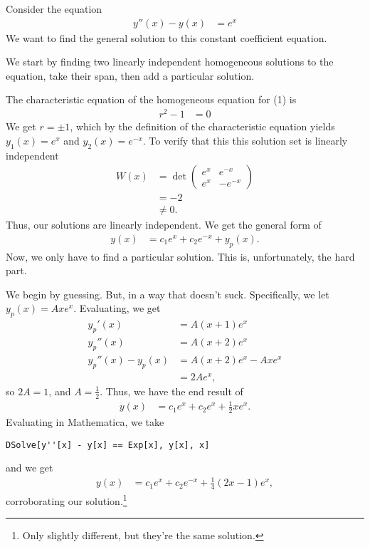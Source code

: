 \documentclass[10pt]{mypackage}
\begin{document}
\begin{example}
  Consider the equation
  \begin{align*}
    y''(x) - y(x) &= e^{x}\tag{1}
  \end{align*}
  We want to find the general solution to this constant coefficient equation.\newline

  We start by finding two linearly independent homogeneous solutions to the equation, take their span, then add a particular solution.\newline

  The characteristic equation of the homogeneous equation for (1) is
  \begin{align*}
    r^2 - 1 &= 0
  \end{align*}
  We get $r=\pm 1$, which by the definition of the characteristic equation yields $y_1(x) = e^{x}$ and $y_2(x) = e^{-x}$. To verify that this this solution set is linearly independent
  {\renewcommand{\arraystretch}{1.25}
    \begin{align*}
      W(x) &= \det \begin{pmatrix}e^{x} & e^{-x} \\ e^{x} & -e^{-x}\end{pmatrix}\\
           &= -2\\
           &\neq 0.
  \end{align*}
  }
  Thus, our solutions are linearly independent. We get the general form of
  \begin{align*}
    y(x) &= c_1e^{x} + c_2e^{-x} + y_p(x).
  \end{align*}
  Now, we only have to find a particular solution. This is, unfortunately, the hard part.\newline

  We begin by guessing. But, in a way that doesn't suck. Specifically, we let $y_p(x) = Axe^{x}$. Evaluating, we get
  \begin{align*}
    y_p'(x) &= A\left(x+1\right)e^{x}\\
    y_{p}''(x) &= A\left(x+2\right)e^{x}\\
    y_{p}''(x) - y_p(x) &= A\left(x+2\right)e^{x} - Axe^{x}\\
                        &= 2Ae^{x},
  \end{align*}
  so $2A = 1$, and $A = \frac{1}{2}$. Thus, we have the end result of
  \begin{align*}
    y(x) &= c_1e^{x} + c_2e^{x} + \frac{1}{2}xe^{x}.
  \end{align*}
  Evaluating in Mathematica, we take
  \begin{lstlisting}[style=mathematicastyle]
    DSolve[y''[x] - y[x] == Exp[x], y[x], x]
  \end{lstlisting}
  and we get
  \begin{align*}
    y(x) &= c_1e^{x} + c_2e^{-x} + \frac{1}{4}\left(2x-1\right)e^{x},
  \end{align*}
  corroborating our solution.\footnote{Only slightly different, but they're the same solution.}
\end{example}
\end{document}
